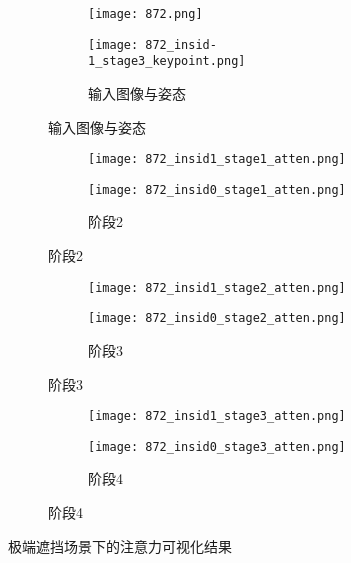 \begin{figure}[h]
	\centering
	\begin{subfigure}[t]{0.22\textwidth}
		\centering
		\begin{subfigure}[t]{\linewidth}
			\texttt{[image: 872.png]}
		\end{subfigure}
		\vskip2pt
		\begin{subfigure}[t]{\linewidth}
			\texttt{[image: 872\_insid-1\_stage3\_keypoint.png]}
			\caption{输入图像与姿态}
		\end{subfigure}
	\end{subfigure}
	\begin{subfigure}[t]{0.22\textwidth}
		\centering
		\begin{subfigure}[t]{\linewidth}
			\texttt{[image: 872\_insid1\_stage1\_atten.png]}
		\end{subfigure}
		\vskip2pt
		\begin{subfigure}[t]{\linewidth}
			\texttt{[image: 872\_insid0\_stage1\_atten.png]}
			\caption{阶段2}
		\end{subfigure}
	\end{subfigure}
	\begin{subfigure}[t]{0.22\textwidth}
		\centering
		\begin{subfigure}[t]{\linewidth}
			\texttt{[image: 872\_insid1\_stage2\_atten.png]}
		\end{subfigure}
		\vskip2pt
		\begin{subfigure}[t]{\linewidth}
			\texttt{[image: 872\_insid0\_stage2\_atten.png]}
			\caption{阶段3}
		\end{subfigure}
	\end{subfigure}
	\begin{subfigure}[t]{0.22\textwidth}
		\centering
		\begin{subfigure}[t]{\linewidth}
			\texttt{[image: 872\_insid1\_stage3\_atten.png]}
		\end{subfigure}
		\vskip2pt
		\begin{subfigure}[t]{\linewidth}
			\texttt{[image: 872\_insid0\_stage3\_atten.png]}
			\caption{阶段4}
		\end{subfigure}
	\end{subfigure}
	\begin{minipage}{0.05\linewidth}
		
		\vskip2cm
	\end{minipage}
	\caption{极端遮挡场景下的注意力可视化结果}
	\label{fig:failcase}
\end{figure}




